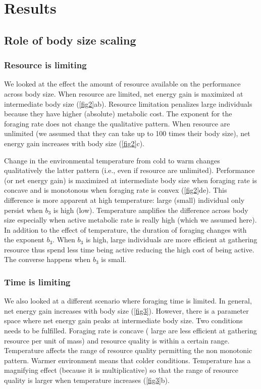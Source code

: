 \section*{Results}
\subsection*{Role of body size scaling}
\subsubsection*{Resource is limiting}
We looked at the effect the amount of resource available on the performance across body size.
  When resource are limited,  net energy gain is maximized at intermediate body size (\cref{fig2}ab).
 Resource limitation penalizes large individuals because they have higher (absolute) metabolic cost. 
 The exponent for the foraging rate does not change the qualitative pattern.
 When resource are unlimited (we assumed that they can take up to 100 times their body size), net energy gain increases with body size (\cref{fig2}c).

Change in the environmental temperature from cold to warm changes qualitatively the latter pattern (i.e., even if resource are unlimited).
Performance (or net energy gain) is maximized at intermediate body size when foraging rate is concave and is monotonous when foraging rate is convex (\cref{fig2}de).
This difference is more apparent at high temperature: large (small) individual only persist when $b_3$ is high (low).  
Temperature amplifies the difference across body size especially when active metabolic rate is really high (which we assumed here).
In addition to the effect of temperature, the duration of foraging changes with  the exponent $b_3$.
When $b_3$ is high, large individuals are more efficient at gathering resource thus spend less time being active reducing the high cost of being active.
The converse happens when $b_3$ is small.
\subsubsection*{Time is limiting}
We also looked at a different scenario where foraging time is limited.
 In general, net energy gain increases with body size (\cref{fig3}).
 However, there is a parameter space where net energy gain peaks at intermediate body size.
 Two conditions needs to be fulfilled.
 Foraging rate is concave ( large are less efficient at gathering resource per unit of mass) and resource quality is within a certain range.
 Temperature affects the range of resource quality permitting the non monotonic pattern.
 Warmer environment means  that colder conditions.
 Temperature has a magnifying effect (because it is multiplicative) so that the range of resource quality is larger when temperature increases (\cref{fig3}b).
 
